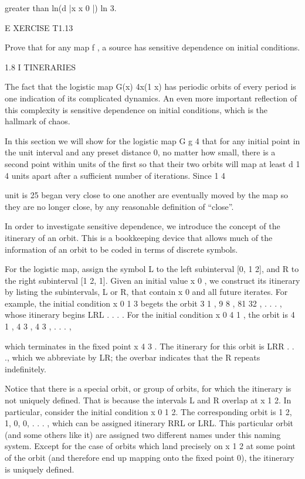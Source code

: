 \documentclass[12pt]{article}
\begin{document}
greater than ln(d  |x  x 0 |)  ln 3.

 

E XERCISE T1.13

Prove that for any map f , a source has sensitive dependence on initial conditions.

1.8 I TINERARIES

The fact that the logistic map G(x)  4x(1  x) has periodic orbits of every period is one indication of its 
complicated dynamics. An even more important reflection of this complexity is sensitive dependence on 
initial conditions, which is the hallmark of chaos.

In this section we will show for the logistic map G  g 4 that for any initial point in the unit interval 
and any preset distance  
 0, no matter how small, there is a second point within  units of the first so that their two orbits will 
map at least d  1  4 units apart after a sufficient number of iterations. Since 1  4

unit is 25%
began very close to one another are eventually moved by the map so they are no longer close, by any 
reasonable definition of “close”.

In order to investigate sensitive dependence, we introduce the concept of the itinerary of an orbit. This 
is a bookkeeping device that allows much of the information of an orbit to be coded in terms of discrete 
symbols.

For the logistic map, assign the symbol L to the left subinterval [0, 1  2], and R to the right subinterval 
[1  2, 1]. Given an initial value x 0 , we construct its itinerary by listing the subintervals, L or R, 
that contain x 0 and all future iterates. For example, the initial condition x 0  1  3 begets the orbit 3 1 
, 9 8 , 81 32 , . . .  , whose itinerary begins LRL . . . . For the initial condition x 0  4 1 , the orbit 
is 4 1 , 4 3 , 4 3 , . . .  ,

which terminates in the fixed point x  4 3 . The itinerary for this orbit is LRR . . ., which we abbreviate 
by LR; the overbar indicates that the R repeats indefinitely.

Notice that there is a special orbit, or group of orbits, for which the itinerary is not uniquely defined. 
That is because the intervals L and R overlap at x  1  2. In particular, consider the initial condition x 0  
1  2. The corresponding orbit is 1  2, 1, 0, 0, . . .  , which can be assigned itinerary RRL or LRL. This 
particular orbit (and some others like it) are assigned two different names under this naming system. 
Except for the case of orbits which land precisely on x  1  2 at some point of the orbit (and therefore end 
up mapping onto the fixed point 0), the itinerary is uniquely defined.
\end{document}
